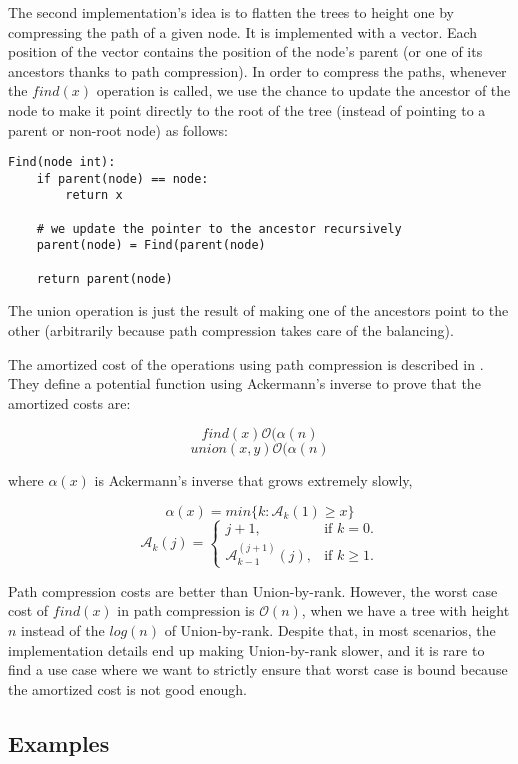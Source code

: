 \documentclass[a4paper,10pt,table,xcdraw]{article}
\begin{document}
The second implementation's idea is to flatten the trees to height one by compressing the path of a given node. It is implemented with a vector. Each position of the vector contains the position of the node's parent (or one of its ancestors thanks to path compression). In order to compress the paths, whenever the $find(x)$ operation is called, we use the chance to update the ancestor of the node to make it point directly to the root of the tree (instead of pointing to a parent or non-root node) as follows:

\begin{verbatim}
Find(node int):
    if parent(node) == node:
        return x
	
    # we update the pointer to the ancestor recursively
    parent(node) = Find(parent(node)
    
    return parent(node)

\end{verbatim}

The union operation is just the result of making one of the ancestors point to the other (arbitrarily because path compression takes care of the balancing).

The amortized cost of the operations using path compression is described in \cite{Harfst}. They define a potential function using Ackermann's inverse to prove that the amortized costs are:

\[ find(x) \mathcal{O} ( \alpha (n) \]
\[union(x, y) \mathcal{O} ( \alpha (n)\]

where $\alpha (x)$ is Ackermann's inverse that grows extremely slowly, 

\[ \alpha (x) = min \{ k: \mathcal{A}_k (1) \geq x \} \]
\[ \mathcal{A}_k (j) = \begin{cases}
    j + 1, & \text{if $k=0$}.\\
    \mathcal{A}_{k-1}^{(j+1)} (j), & \text{if $k \geq 1$}.
  \end{cases}
\]

Path compression costs are better than Union-by-rank. However, the worst case cost of $find(x)$ in path compression is $\mathcal{O} (n)$, when we have a tree with height $n$ instead of the $log (n)$ of Union-by-rank. Despite that, in most scenarios, the implementation details end up making Union-by-rank slower, and it is rare to find a use case where we want to strictly ensure that worst case is bound because the amortized cost is not good enough.

\subsection{Examples}
\label{subsubsec:uf-examples} 
\end{document}
